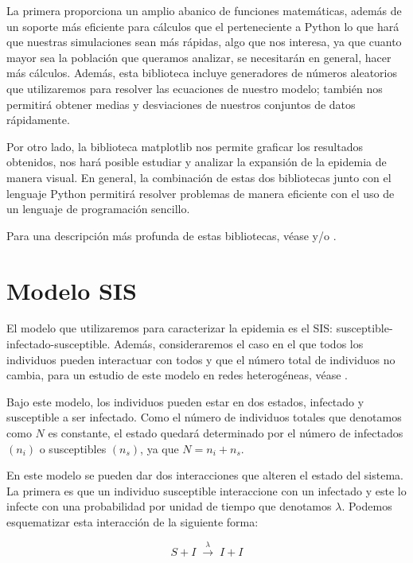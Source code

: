 La primera proporciona un amplio abanico de funciones matemáticas, además de un soporte más eficiente para cálculos que el perteneciente a Python
lo que hará que nuestras simulaciones sean más rápidas, algo que nos interesa, ya que cuanto mayor sea la población que queramos analizar, se necesitarán
en general, hacer más cálculos. Además, esta biblioteca incluye generadores de números aleatorios que utilizaremos para resolver las ecuaciones de 
nuestro modelo; también nos permitirá obtener medias y desviaciones de nuestros conjuntos de datos rápidamente.

Por otro lado, la biblioteca matplotlib nos permite graficar los resultados obtenidos, nos hará posible estudiar y analizar la expansión de la epidemia
de manera visual. En general, la combinación de estas dos bibliotecas junto con el lenguaje Python permitirá resolver problemas de manera eficiente
con el uso de un lenguaje de programación sencillo.

Para una descripción más profunda de estas bibliotecas, véase \cite{McKinney} y/o \cite{VanderPlas}.

\section{Modelo SIS}\label{sec:modelo sis}
El modelo que utilizaremos para caracterizar la epidemia es el SIS: susceptible-infectado-susceptible.
Además, consideraremos el caso en el que todos los individuos pueden interactuar con todos y que el número total de individuos no cambia, para un estudio de 
este modelo en redes heterogéneas, véase \cite{Satorras}. 

Bajo este modelo, los individuos pueden estar en dos estados, infectado y susceptible a ser infectado. Como el número de individuos totales que denotamos como $N$
es constante, el estado quedará determinado por el número de infectados $(n_i)$ o susceptibles $(n_s)$, ya que $N=n_i+n_s$.

En este modelo se pueden dar dos interacciones que alteren el estado del sistema. La primera es que un individuo susceptible interaccione con un infectado
y este lo infecte con una probabilidad por unidad de tiempo que denotamos $\lambda$. Podemos esquematizar esta interacción de la siguiente forma:

\begin{equation}
    S+I \;\xrightarrow{\lambda}\;I+I
    \label{eq: infección de susceptible}
\end{equation}

